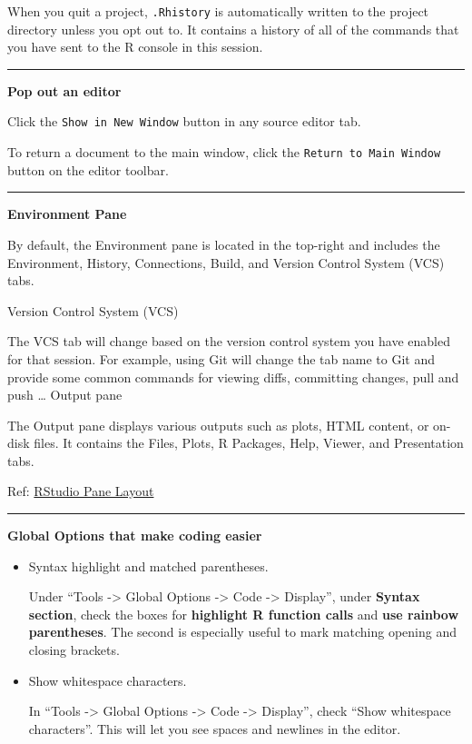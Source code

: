 \documentclass[
]{book}
\begin{document}
When you quit a project, \texttt{.Rhistory} is automatically written to the project directory unless you opt out to. It contains a history of all of the commands that you have sent to the R console in this session.

\begin{center}\rule{0.5\linewidth}{0.5pt}\end{center}

\textbf{Pop out an editor}

Click the \texttt{Show\ in\ New\ Window} button in any source editor tab.

To return a document to the main window, click the \texttt{Return\ to\ Main\ Window} button on the editor toolbar.

\begin{center}\rule{0.5\linewidth}{0.5pt}\end{center}

\textbf{Environment Pane}

By default, the Environment pane is located in the top-right and includes the Environment, History, Connections, Build, and Version Control System (VCS) tabs.

Version Control System (VCS)

The VCS tab will change based on the version control system you have enabled for that session. For example, using Git will change the tab name to Git and provide some common commands for viewing diffs, committing changes, pull and push \ldots{}
Output pane

The Output pane displays various outputs such as plots, HTML content, or on-disk files. It contains the Files, Plots, R Packages, Help, Viewer, and Presentation tabs.

Ref: \href{https://docs.posit.co/ide/user/ide/guide/ui/ui-panes.html\#:~:text=four\%20primary\%20panes.-,To\%20add\%20additional\%20source\%20columns\%2C\%20from\%20the\%20RStudio\%20menu\%3A\%20Global,only\%20within\%20the\%20Source\%20pane.}{RStudio Pane Layout}

\begin{center}\rule{0.5\linewidth}{0.5pt}\end{center}

\textbf{Global Options that make coding easier}

\begin{itemize}
\item
  Syntax highlight and matched parentheses.

  Under ``Tools -\textgreater{} Global Options -\textgreater{} Code -\textgreater{} Display'', under \textbf{Syntax section}, check the boxes for \textbf{highlight R function calls} and \textbf{use rainbow parentheses}. The second is especially useful to mark matching opening and closing brackets.
\item
  Show whitespace characters.

  In ``Tools -\textgreater{} Global Options -\textgreater{} Code -\textgreater{} Display'', check ``Show whitespace characters''. This will let you see spaces and newlines in the editor.
\end{itemize}
\end{document}
